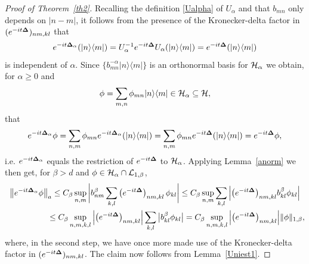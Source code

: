 \documentclass[10pt,a4paper]{amsart}
\begin{document}
\begin{proof}[Proof of Theorem~\ref{th2}]
Recalling the def\/inition \eqref{Ualpha} of $U_\alpha$ and that
$b_{mn}$ only depends on $|n-m|$, it follows from the presence of the
Kronecker-delta factor in $(e^{-it{\bf{\Delta}}})_{nm,kl}$ that
\[
e^{-it{\bf{\Delta}}_\alpha}(|n\rangle\langle m|) = U_\alpha^{-1}
e^{-it{\bf{\Delta}}}U_\alpha(|n\rangle\langle m|) = e^{-it{\bf{\Delta}}}(|n\rangle\langle m|)
\]
is independent of $\alpha$. Since
$\{b_{mn}^{-\alpha}|n\rangle\langle m|\}$ is an orthonormal basis
for ${\cal H}_\alpha$ we obtain, for $\alpha\geq 0$ and
\[
\phi =
\sum_{m,n}\phi_{mn}|n\rangle\langle m| \in {\cal H}_\alpha\subseteq
{\cal H} ,
\]
that
\[
e^{-it{\bf{\Delta}}_\alpha}\phi =
\sum_{n,m}\phi_{mn}e^{-it{\bf{\Delta}}_\alpha}(|n\rangle\langle m|) =
\sum_{n,m}\phi_{mn}e^{-it{\bf{\Delta}}}(|n\rangle\langle m|) = e^{-it{\bf{\Delta}}}\phi ,
\]
i.e. $e^{-it{\bf{\Delta}}_\alpha}$ equals the restriction of $e^{-it{\bf{\Delta}}}$
to ${\cal H}_\alpha$.
Applying  Lemma~\ref{anorm} we then get, for $\beta>d$ and
$\phi\in {\cal H}_\alpha\cap {\cal L}_{1,\beta}$,
\begin{gather*}
\big\Vert e^{-it{\bf{\Delta}}_\alpha}\phi\big\Vert_a
 \leq
 C_\beta \sup_{n,m}\bigg|b_{nm}^{\beta}
\sum_{k,l}\big(e^{-it{\bf{\Delta}}}\big)_{nm,kl}\,\phi_{kl}\bigg|
 \leq C_\beta \sup_{n,m}\sum_{k,l}\Big|
\big(e^{-it{\bf{\Delta}}}\big)_{nm,kl} b_{kl}^{\beta} \phi_{kl}\Big|\\
\phantom{\big\Vert e^{-it{\bf{\Delta}}_\alpha}\phi\big\Vert_a}{}
\leq
C_\beta \sup_{n,m,k,l}\Big|\big(e^{-it{\bf{\Delta}}}\big)_{nm,kl}\Big| \sum_{k,l}\big|b_{kl}^{\beta} \phi_{kl}\big|
= C_\beta \sup_{n,m,k,l}\Big|\big(e^{-it{\bf{\Delta}}}\big)_{nm,kl}\Big|
\Vert\phi\Vert_{1,\beta} ,
\end{gather*}
where, in the second step, we have once more made use of the
Kronecker-delta factor in $(e^{-it{\bf{\Delta}}})_{nm,kl}$.
The claim now follows from Lemma~\ref{Uniest1}.
\end{proof}
\end{document}
